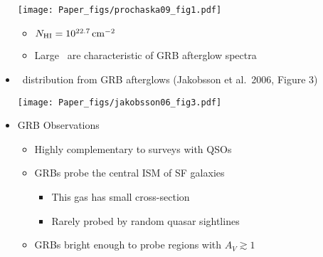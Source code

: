 \documentclass[12pt,letterpaper]{article}
\begin{document}
\begin{Aenumerate}
\begin{itemize}
\texttt{[image: Paper\_figs/prochaska09\_fig1.pdf]}

    \begin{itemize}
    \item $N_{\rm HI} = 10^{22.7} \, {\rm cm^{-2}}$
    \item Large \nhi\ are characteristic of GRB afterglow spectra
    \end{itemize}

  \item \nhi\ distribution from GRB afterglows (Jakobsson et al.\ 2006, Figure 3)

\texttt{[image: Paper\_figs/jakobsson06\_fig3.pdf]}

  \item GRB Observations
    \begin{itemize}
    \item Highly complementary to surveys with QSOs
    \item GRBs probe the central ISM of SF galaxies
      \begin{itemize}
      \item This gas has small cross-section
      \item Rarely probed by random quasar sightlines
      \end{itemize}
    \item GRBs bright enough to probe regions with $A_V \gtrsim 1$
    \end{itemize}

  \end{itemize}

\end{Aenumerate}
\end{document}
